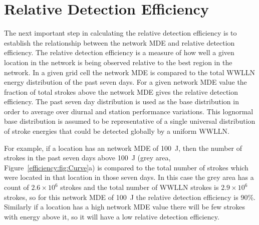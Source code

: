 \section{Relative Detection Efficiency}

The next important step in calculating the relative detection efficiency is to establish the relationship between the network MDE and relative detection efficiency.
The relative detection efficiency is a measure of how well a given location in the network is being observed relative to the best region in the network.
In a given grid cell the network MDE is compared to the total WWLLN energy distribution of the past seven days.
For a given network MDE value the fraction of total strokes above the network MDE gives the relative detection efficiency.
The past seven day distribution is used as the base distribution in order to average over diurnal and station performance variations.
This lognormal base distribution is assumed to be representative of a single universal distribution of stroke energies that could be detected globally by a uniform WWLLN.

For example, if a location has an network MDE of 100~J, then the number of strokes in the past seven days above 100~J (grey area, Figure~\ref{efficiency:fig:Curve}a) is compared to the total number of strokes which were located in that location in those seven days.
In this case the grey area has a count of $2.6\times10^6$ strokes and the total number of WWLLN strokes is $2.9\times10^6$ strokes, so for this network MDE of 100~J the relative detection efficiency is 90\%.
Similarly if a location has a high network MDE value there will be few strokes with energy above it, so it will have a low relative detection efficiency.


